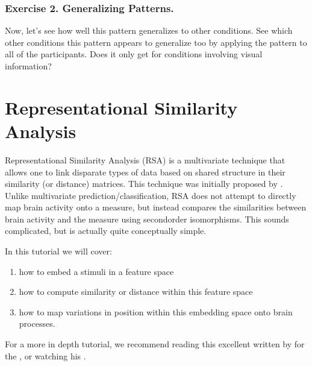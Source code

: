 \documentclass[letterpaper,10pt,english]{sphinxmanual}
\begin{document}
\subsubsection{Exercise 2. Generalizing Patterns.}
\label{\detokenize{content/Multivariate_Prediction:exercise-2-generalizing-patterns}}
Now, let’s see how well this pattern generalizes to other conditions. See which other conditions this pattern appears to generalize too by applying the pattern to all of the participants. Does it only get  for conditions involving visual information?


\section{Representational Similarity Analysis}
\label{\detokenize{content/RSA:representational-similarity-analysis}}\label{\detokenize{content/RSA::doc}}

Representational Similarity Analysis (RSA) is a multivariate technique that allows one to link disparate types of data based on shared structure in their similarity (or distance) matrices. This technique was initially proposed by . Unlike multivariate prediction/classification, RSA does not attempt to directly map brain activity onto a measure, but instead compares the similarities between brain activity and the measure using second\sphinxhyphen{}order isomorphisms. This sounds complicated, but is actually quite conceptually simple.

In this tutorial we will cover:
\begin{enumerate}
%
\item {} 
how to embed a stimuli in a feature space

\item {} 
how to compute similarity or distance within this feature space

\item {} 
how to map variations in position within this embedding space onto brain processes.

\end{enumerate}

For a more in depth tutorial, we recommend reading this excellent  written by  for the , or watching his .
\end{document}
